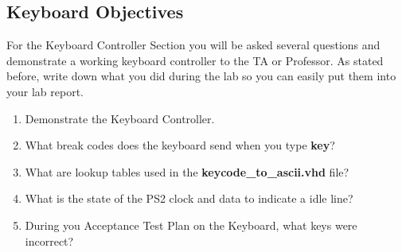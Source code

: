 \documentclass{article}
\begin{document}
\subsection{Keyboard Objectives}
For the Keyboard Controller Section you will be asked several questions and demonstrate a working keyboard controller to the TA or Professor. As stated before, write down what you did during the lab so you can easily put them into your lab report.

\begin{enumerate}
  \item Demonstrate the Keyboard Controller.
  \item What break codes does the keyboard send when you type \textbf{key}?
  \item What are lookup tables used in the \textbf{keycode\_to\_ascii.vhd} file?
  \item What is the state of the PS2 clock and data to indicate a idle line?
  \item During you Acceptance Test Plan on the Keyboard, what keys were incorrect?
\end{enumerate}

\newpage
\end{document}
